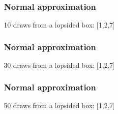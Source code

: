 \documentclass[handout]{beamer}
\begin{document}
   \begin{frame}
   \frametitle{Normal approximation}
   \begin{center}
   \end{center}
   10 draws from a lopsided box: [1,2,7]
   \end{frame}



   \begin{frame}
   \frametitle{Normal approximation}
   \begin{center}
   \end{center}
   30 draws from a lopsided box: [1,2,7]
   \end{frame}



   \begin{frame}
   \frametitle{Normal approximation}
   \begin{center}
   \end{center}
   50 draws from a lopsided box: [1,2,7]
   \end{frame}


   \begin{frame} 

   \end{frame}


   \begin{frame} 

   \end{frame}

   
\end{document}
